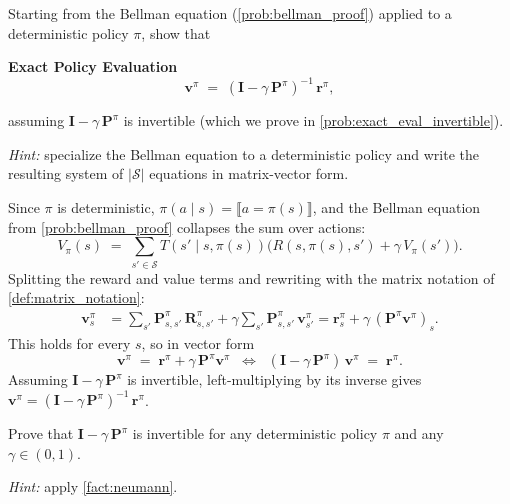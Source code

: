 \documentclass[11pt]{article}
\newcommand{\cS}{\mathcal{S}}
\begin{document}
\begin{exercise}
\label{prob:exact_eval_derive} Starting from the Bellman equation (\cref{prob:bellman_proof}) applied to a deterministic policy $\pi$, show that
\begin{callout}[note]
\textbf{Exact Policy Evaluation}
$$
\mathbf{v}^\pi \;=\; (\mathbf{I} - \gamma\, \mathbf{P}^\pi)^{-1}\, \mathbf{r}^\pi,
$$
\end{callout}
assuming $\mathbf{I} - \gamma\, \mathbf{P}^\pi$ is invertible (which we prove in \cref{prob:exact_eval_invertible}).

\textit{Hint:} specialize the Bellman equation to a deterministic policy and write the resulting system of $|\cS|$ equations in matrix-vector form.
\end{exercise}

\begin{solution}
Since $\pi$ is deterministic, $\pi(a \mid s) = \llbracket a = \pi(s) \rrbracket$, and the Bellman equation from \cref{prob:bellman_proof} collapses the sum over actions:
$$
V_\pi(s) \;=\; \sum_{s' \in \cS} T(s' \mid s, \pi(s))\bigl(R(s, \pi(s), s') + \gamma\, V_\pi(s')\bigr).
$$
Splitting the reward and value terms and rewriting with the matrix notation of \cref{def:matrix_notation}:
\begin{align*}
\mathbf{v}^\pi_s
&= \sum_{s'} \mathbf{P}^\pi_{s,s'}\, \mathbf{R}^\pi_{s,s'} + \gamma \sum_{s'} \mathbf{P}^\pi_{s,s'}\, \mathbf{v}^\pi_{s'}
= \mathbf{r}^\pi_s + \gamma\, (\mathbf{P}^\pi \mathbf{v}^\pi)_s.
\end{align*}
This holds for every $s$, so in vector form
$$
\mathbf{v}^\pi \;=\; \mathbf{r}^\pi + \gamma\, \mathbf{P}^\pi \mathbf{v}^\pi
\;\;\Longleftrightarrow\;\; (\mathbf{I} - \gamma\, \mathbf{P}^\pi)\, \mathbf{v}^\pi \;=\; \mathbf{r}^\pi.
$$
Assuming $\mathbf{I} - \gamma\, \mathbf{P}^\pi$ is invertible, left-multiplying by its inverse gives $\mathbf{v}^\pi = (\mathbf{I} - \gamma\, \mathbf{P}^\pi)^{-1}\, \mathbf{r}^\pi$.
\end{solution}

\begin{exercise}
\label{prob:exact_eval_invertible} Prove that $\mathbf{I} - \gamma\, \mathbf{P}^\pi$ is invertible for any deterministic policy $\pi$ and any $\gamma \in (0, 1)$.

\textit{Hint:} apply \cref{fact:neumann}.
\end{exercise}
\end{document}
